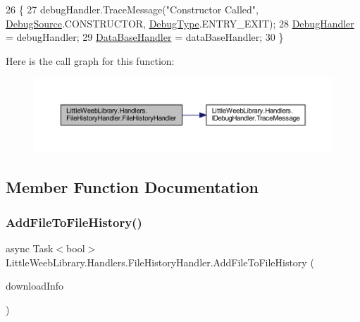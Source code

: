\begin{DoxyCode}
26         \{
27             debugHandler.TraceMessage(\textcolor{stringliteral}{"Constructor Called"}, \mbox{\hyperlink{namespace_little_weeb_library_1_1_handlers_a2a6ca0775121c9c503d58aa254d292be}{DebugSource}}.CONSTRUCTOR, 
      \mbox{\hyperlink{namespace_little_weeb_library_1_1_handlers_ab66019ed40462876ec4e61bb3ccb0a62}{DebugType}}.ENTRY\_EXIT);
28             \mbox{\hyperlink{class_little_weeb_library_1_1_handlers_1_1_file_history_handler_afeb86d3ea5c145f7dd6937f061679395}{DebugHandler}} = debugHandler;
29             \mbox{\hyperlink{class_little_weeb_library_1_1_handlers_1_1_file_history_handler_afe186c8ea770ecb9253a07f82f23c471}{DataBaseHandler}} = dataBaseHandler;
30         \}
\end{DoxyCode}
Here is the call graph for this function\+:\nopagebreak
\begin{figure}[H]
\begin{center}
\leavevmode
\includegraphics[width=350pt]{class_little_weeb_library_1_1_handlers_1_1_file_history_handler_ab8aa730a5d9db1b2624723394bd06191_cgraph}
\end{center}
\end{figure}


\subsection{Member Function Documentation}
\mbox{\label{class_little_weeb_library_1_1_handlers_1_1_file_history_handler_a615bf14eae35f656b211f0500abe4d29}} 
\subsubsection{\texorpdfstring{Add\+File\+To\+File\+History()}{AddFileToFileHistory()}}
{\footnotesize\ttfamily async Task$<$bool$>$ Little\+Weeb\+Library.\+Handlers.\+File\+History\+Handler.\+Add\+File\+To\+File\+History (\begin{DoxyParamCaption}\item[{\mbox{\hyperlink{class_little_weeb_library_1_1_models_1_1_json_downloaded_info}{Json\+Downloaded\+Info}}}]{download\+Info }\end{DoxyParamCaption})}



